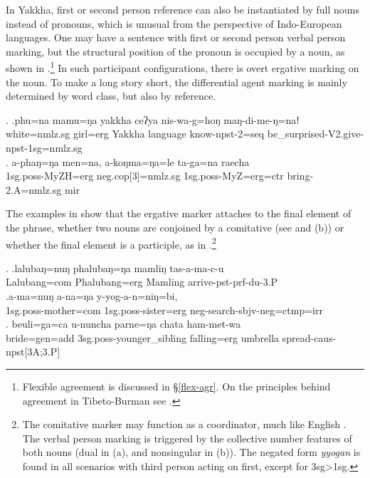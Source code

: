 	
In Yakkha, first or second person reference can also be instantiated by full nouns instead of pronouns, which is unusual from the perspective of Indo-European languages. One may have a sentence with first or second person verbal person marking, but the structural position of the pronoun is occupied by a noun, as shown in \Next.\footnote{Flexible agreement is discussed in §\ref{flex-agr}. On the principles behind agreement in Tibeto-Burman see  \citet{Bickel2000On-the-syntax}.} In such participant configurations, there is overt ergative marking on the noun. To make a long story short, the differential agent marking is mainly determined  by word class, but also by reference.
	
	\ex. \ag.phu=na mamu=ŋa yakkha ceʔya nis-wa-g=hoŋ maŋ-di-me-ŋ=naǃ\\
	white{\sc =nmlz.sg} girl{\sc =erg} Yakkha language know{\sc -npst-2=seq}  be\_surprised{\sc -V2.give-npst-1sg=nmlz.sg}\\
	\bg. a-phaŋ=ŋa men=na, a-koŋma=ŋa=le   ta-ga=na           raecha\\
		{\sc 1sg.poss-}MyZH{\sc =erg}  {\sc  neg.cop[3]=nmlz.sg} {\sc 1sg.poss-}MyZ{\sc =erg=ctr} bring{\sc [pst;3.P]-2.A=nmlz.sg} {\sc mir}\\
		 

The examples in  \Next show that the ergative marker attaches to the final element of the phrase,  whether two nouns are conjoined by a comitative (see \Next[a] and (b)) or whether the final element is a participle, as in \Next[c].\footnote{The comitative marker may function as a coordinator, much like English . The verbal person marking is triggered by the collective number features of both nouns (dual in (a), and nonsingular in (b)). The negated form \emph{yyogan} is found in all scenarios with third person acting on first, except for {\sc 3sg>1sg}.}
	
	\ex. \ag.lalubaŋ=nuŋ   phalubaŋ=ŋa   mamliŋ   tas-a-ma-c-u\\
	Lalubang{\sc =com} Phalubang{\sc =erg} Mamling arrive{\sc -pst-prf-du-3.P}\\
	\bg.a-ma=nuŋ  a-na=ŋa  y-yog-a-n=niŋ=bi, \\
	{\sc 1sg.poss-}mother{\sc =com} {\sc 1sg.poss-}sister{\sc =erg} {\sc neg-}search{\sc [3A;1.P]-sbjv-neg=ctmp=irr}\\
	\bg.   beuli=ga=ca  u-nuncha parne=ŋa    chata    ham-met-wa\\
	bride{\sc =gen=add} {\sc 3sg.poss-}younger\_sibling  falling{\sc =erg} umbrella spread{\sc -caus-npst[3A;3.P]}\\

